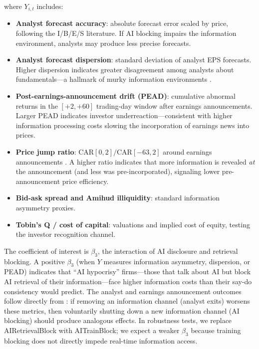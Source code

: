 \documentclass[12pt,a4paper]{article}
\begin{document}
\noindent where $Y_{i,t}$ includes:
\begin{itemize}
    \item \textbf{Analyst forecast accuracy}: absolute forecast error scaled by price, following the I/B/E/S literature. If AI blocking impairs the information environment, analysts may produce less precise forecasts.
    \item \textbf{Analyst forecast dispersion}: standard deviation of analyst EPS forecasts. Higher dispersion indicates greater disagreement among analysts about fundamentals---a hallmark of murky information environments \citep{ChenKellyWu2020}.
    \item \textbf{Post-earnings-announcement drift (PEAD)}: cumulative abnormal returns in the $[+2, +60]$ trading-day window after earnings announcements. Larger PEAD indicates investor underreaction---consistent with higher information processing costs slowing the incorporation of earnings news into prices.
    \item \textbf{Price jump ratio}: CAR$[0,2]/$CAR$[-63,2]$ around earnings announcements \citep[following][]{ChenKellyWu2020}. A higher ratio indicates that more information is revealed \emph{at} the announcement (and less was pre-incorporated), signaling lower pre-announcement price efficiency.
    \item \textbf{Bid-ask spread and Amihud illiquidity}: standard information asymmetry proxies.
    \item \textbf{Tobin's Q / cost of capital}: valuations and implied cost of equity, testing the \citet{Merton1987} investor recognition channel.
\end{itemize}

The coefficient of interest is $\beta_3$, the interaction of AI disclosure and retrieval blocking. A positive $\beta_3$ (when $Y$ measures information asymmetry, dispersion, or PEAD) indicates that ``AI hypocrisy'' firms---those that talk about AI but block AI retrieval of their information---face higher information costs than their say-do consistency would predict. The analyst and earnings announcement outcomes follow directly from \citet{ChenKellyWu2020}: if removing an information channel (analyst exits) worsens these metrics, then voluntarily shutting down a new information channel (AI blocking) should produce analogous effects. In robustness tests, we replace AIRetrievalBlock with AITrainBlock; we expect a weaker $\beta_3$ because training blocking does not directly impede real-time information access.
\end{document}
